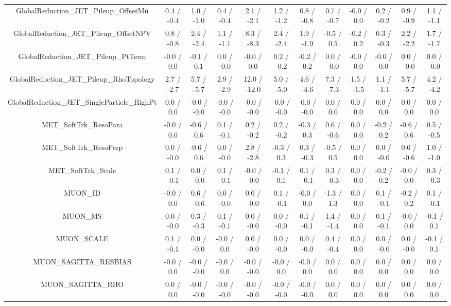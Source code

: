 \begin{table}[htbp]
\begin{center}
\begin{tabular}{|c|c|c|c|c|c|c|c|c|c|c|c|}
  GlobalReduction_JET_Pileup_OffsetMu & 0.4 / -0.4 & 1.0 / -1.0 & 0.4 / -0.4 & 2.1 / -2.1 & 1.2 / -1.2 & 0.8 / -0.8 & 0.7 / -0.7 & -0.0 / 0.0 & 0.2 / -0.2 & 0.9 / -0.9 & 1.1 / -1.1 \\ 
  GlobalReduction_JET_Pileup_OffsetNPV & 0.8 / -0.8 & 2.4 / -2.4 & 1.1 / -1.1 & 8.3 / -8.3 & 2.4 / -2.4 & 1.9 / -1.9 & -0.5 / 0.5 & -0.2 / 0.2 & 0.3 / -0.3 & 2.2 / -2.2 & 1.7 / -1.7 \\ 
  GlobalReduction_JET_Pileup_PtTerm & -0.0 / 0.0 & -0.1 / 0.1 & 0.0 / -0.0 & -0.0 / 0.0 & 0.2 / -0.2 & -0.2 / 0.2 & 0.0 / -0.0 & -0.0 / 0.0 & -0.0 / 0.0 & 0.0 / -0.0 & 0.0 / -0.0 \\ 
  GlobalReduction_JET_Pileup_RhoTopology & 2.7 / -2.7 & 5.7 / -5.7 & 2.9 / -2.9 & 12.0 / -12.0 & 5.0 / -5.0 & 4.6 / -4.6 & 7.3 / -7.3 & 1.5 / -1.5 & 1.1 / -1.1 & 5.7 / -5.7 & 4.2 / -4.2 \\ 
  GlobalReduction_JET_SingleParticle_HighPt & 0.0 / 0.0 & -0.0 / -0.0 & -0.0 / -0.0 & -0.0 / -0.0 & -0.0 / -0.0 & -0.0 / -0.0 & 0.0 / 0.0 & 0.0 / 0.0 & 0.0 / 0.0 & 0.0 / 0.0 & 0.0 / 0.0 \\ 
  MET_SoftTrk_ResoPara & -0.0 / 0.0 & -0.6 / 0.6 & 0.1 / -0.1 & 0.2 / -0.2 & 0.2 / -0.2 & -0.3 / 0.3 & 0.6 / -0.6 & 0.0 / 0.0 & -0.2 / 0.2 & -0.6 / 0.6 & 0.5 / -0.5 \\ 
  MET_SoftTrk_ResoPerp & 0.0 / -0.0 & -0.6 / 0.6 & 0.0 / -0.0 & 2.8 / -2.8 & -0.3 / 0.3 & 0.3 / -0.3 & -0.5 / 0.5 & 0.0 / 0.0 & 0.0 / -0.0 & 0.6 / -0.6 & 1.0 / -1.0 \\ 
  MET_SoftTrk_Scale & 0.1 / -0.1 & 0.0 / -0.0 & 0.1 / -0.1 & -0.0 / -0.0 & -0.1 / 0.1 & 0.1 / -0.1 & 0.3 / -0.3 & 0.0 / 0.0 & -0.2 / 0.2 & -0.0 / 0.0 & 0.3 / -0.3 \\ 
  MUON_ID & -0.0 / 0.0 & 0.6 / -0.6 & 0.0 / -0.0 & 0.0 / -0.0 & 0.1 / -0.1 & -0.0 / 0.0 & -1.3 / 1.3 & 0.0 / 0.0 & 0.1 / -0.1 & -0.2 / 0.2 & 0.1 / -0.1 \\ 
  MUON_MS & 0.0 / -0.0 & 0.3 / -0.3 & 0.1 / -0.1 & 0.0 / -0.0 & 0.0 / -0.0 & 0.1 / -0.1 & 1.4 / -1.4 & 0.0 / 0.0 & 0.1 / -0.1 & -0.0 / 0.0 & -0.1 / 0.1 \\ 
  MUON_SCALE & 0.1 / -0.1 & 0.0 / -0.0 & -0.0 / 0.0 & 0.0 / -0.0 & 0.0 / -0.0 & 0.0 / -0.0 & 0.4 / -0.4 & 0.0 / 0.0 & 0.0 / -0.0 & 0.0 / -0.0 & -0.1 / 0.1 \\ 
  MUON_SAGITTA_RESBIAS & -0.0 / 0.0 & -0.0 / -0.0 & -0.0 / 0.0 & -0.0 / -0.0 & -0.0 / 0.0 & -0.0 / 0.0 & 0.0 / 0.0 & 0.0 / 0.0 & 0.0 / 0.0 & 0.0 / 0.0 & 0.0 / 0.0 \\ 
  MUON_SAGITTA_RHO & 0.0 / 0.0 & -0.0 / -0.0 & -0.0 / -0.0 & -0.0 / -0.0 & -0.0 / -0.0 & -0.0 / -0.0 & 0.0 / 0.0 & 0.0 / 0.0 & 0.0 / 0.0 & 0.0 / 0.0 & 0.0 / 0.0 \\ 

\end{tabular}
\end{center}
\end{table}
